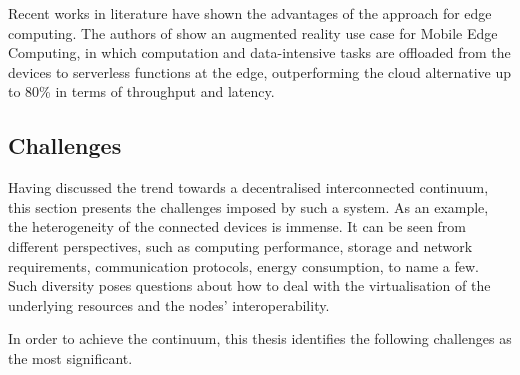 \documentclass{ieeeaccess}
\begin{document}
Recent works in literature have shown the advantages of the approach for edge computing. The authors of \cite{serverless-mec} show an augmented reality use case for Mobile Edge Computing, in which computation and data-intensive tasks are offloaded from the devices to serverless functions at the edge, outperforming the cloud alternative up to 80\% in terms of throughput and latency.

\subsection{Challenges}

Having discussed the trend towards a decentralised interconnected continuum, this section presents the challenges imposed by such a system. As an example, the heterogeneity of the connected devices is immense. It can be seen from different perspectives, such as computing performance, storage and network requirements, communication protocols, energy consumption, to name a few. Such diversity poses questions about how to deal with the virtualisation of the underlying resources and the nodes' interoperability.

In order to achieve the continuum, this thesis identifies the following challenges as the most significant. 
\label{challenges}
\end{document}
